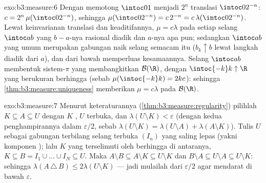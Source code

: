 \begin{solution}{exo:b3:measure:6}
Dengan memotong $\intoc01$ menjadi $2^n$ translasi $\intoc0{2^{-n}}$:
$c = 2^n\,\mu(\intoc0{2^{-n}})$, sehingga $\mu(\intoc0{2^{-n}}) =
c\,2^{-n} = c\,\lambda(\intoc0{2^{-n}})$. Lewat keinvarianan translasi
dan keaditifannya, $\mu = c\lambda$ pada setiap selang
$\intoc ab$ yang $b - a$-nya rasional diadik dan $a$-nya apa pun; sedangkan
$\intoc ab$ yang umum merupakan gabungan naik selang semacam itu
($b_k \uparrow b$ lewat langkah diadik dari $a$), dan  dari
bawah memperluas kesamaannya. Selang $\intoc ab$ membentuk
sistem-$\pi$ yang membangkitkan $\mathcal B(\R)$, dengan $\intoc{-k}k
\uparrow \R$ yang berukuran berhingga (sebab $\mu(\intoc{-k}k) = 2kc$):
sehingga \cref{thm:b3:measure:uniqueness} memberikan $\mu = c\lambda$ pada
$\mathcal B(\R)$.
\end{solution}

\begin{solution}{exo:b3:measure:7}
Menurut keteraturannya (\cref{thm:b3:measure:regularity}) pilihlah $K
\subseteq A \subseteq U$ dengan $K$ , $U$ terbuka, dan
$\lambda(U\setminus K) < \varepsilon$ (dengan kedua penghampirannya
dalam $\varepsilon/2$, sebab $\lambda(U \setminus K) =
\lambda(U\setminus A) + \lambda(A \setminus K)$). Tulis $U$ sebagai
gabungan terbilang selang terbuka $(I_n)$ yang saling lepas (yakni
komponen ); lalu $K$ yang  terselimuti oleh
berhingga di antaranya, $K \subseteq B = I_1\cup\dots\cup I_N \subseteq
U$. Maka $A \setminus B \subseteq A\setminus K \subseteq
U\setminus K$ dan $B \setminus A \subseteq U \setminus A
\subseteq U\setminus K$: sehingga
$\lambda(A\,\triangle\,B) \leq 2\lambda(U\setminus K)$ ---
jadi mulailah dari $\varepsilon/2$ agar mendarat di bawah $\varepsilon$.
\end{solution}

